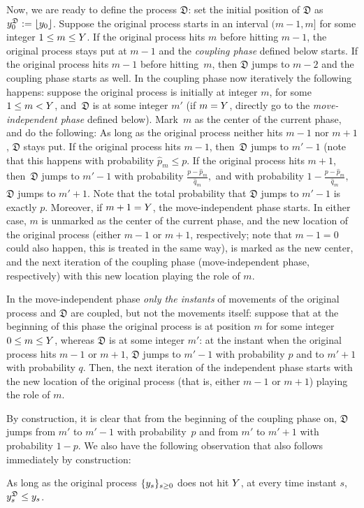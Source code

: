 	Now, we are ready to define the process $\mathfrak{D}$: set the initial position of $\mathfrak{D}$ as $y_0^{\mathfrak{D}} := \lfloor y_0 \rfloor$. Suppose the original process starts in an interval $(m-1,m]$ for some integer $1 \le m \le Y$.  If the original process hits $m$ before hitting $m-1$, the original process stays put at $m-1$ and the \emph{coupling phase} defined below starts.  If the original process hits $m-1$ before hitting~$m$, then $\mathfrak{D}$ jumps to $m-2$ and the coupling phase starts as well. In the coupling phase now iteratively the following happens: suppose the original process is initially at integer $m$, for some $1 \le m < Y$, and~$\mathfrak{D}$ is at some integer $m'$ (if $m=Y$, directly go to the \emph{move-independent phase} defined below). Mark~$m$ as the center of the current phase, and do the following: As long as the original process neither hits $m-1$ nor $m+1$, $\mathfrak{D}$ stays put. If the original process hits $m-1$, then~$\mathfrak{D}$ jumps to $m'-1$ (note that this happens with probability $\widehat{p}_m \le p$. If the original process hits $m+1$, then~$\mathfrak{D}$ jumps to $m'-1$ with probability $\frac{p-\widehat{p}_m}{\widehat{q}_m},$ and with probability $1-\frac{p-\widehat{p}_m}{\widehat{q}_m},$ $\mathfrak{D}$ jumps to $m'+1$. Note that the total probability that $\mathfrak{D}$ jumps to $m'-1$ is exactly $p$. Moreover, if $m+1=Y$, the move-independent phase starts. In either case, $m$ is unmarked as the center of the current phase, and the new location of the original process (either $m-1$ or $m+1$, respectively; note that $m-1=0$ could also happen, this is treated in the same way), is marked as the new center, and the next iteration of the coupling phase (move-independent phase, respectively) with this new location playing the role of $m$. 
	
	In the move-independent phase \emph{only the instants} of movements of the original process and $\mathfrak{D}$ are coupled, but not the movements itself: suppose that at the beginning of this phase the original process is at position $m$ for some integer $0 \le m \le Y$, whereas $\mathfrak{D}$ is at some integer $m'$: at the instant when the original process hits $m-1$ or $m+1$, $\mathfrak{D}$ jumps to $m'-1$ with probability $p$ and to $m'+1$ with probability $q$. Then, the next iteration of the independent phase starts with the new location of the original process (that is, either $m-1$ or $m+1$) playing the role of $m$.
	
	\noindent\par
	By construction, it is clear that from the beginning of the coupling phase on, $\mathfrak{D}$ jumps from $m'$ to $m'-1$ with probability~$p$ and from $m'$ to $m'+1$ with probability $1-p$. We also have the following observation that also follows immediately by construction:
	\begin{observation}\label{obs:domination}
	    As long as the original process $\{y_s\}_{s \ge 0}$ does not hit $Y$, at every time instant $s$, $y_s^{\mathfrak{D}} \le y_s$.
	\end{observation}


